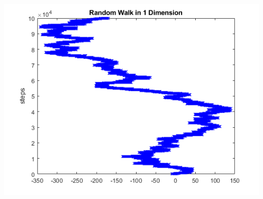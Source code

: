 \documentclass{article}
\begin{document}
\begin{center}
    \includegraphics[scale = 0.5]{r1d1000000.png}
\end{center}
\end{document}

